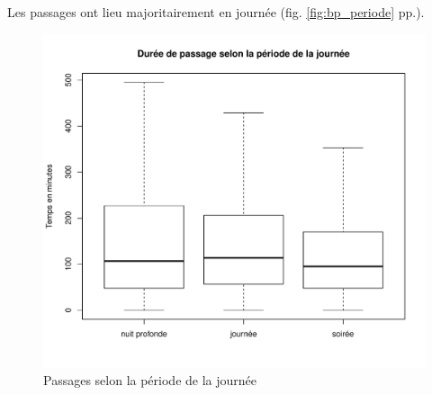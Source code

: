 \documentclass[12pt,english,french,twoside]{book}\usepackage[]{graphicx}\usepackage[]{color}
\makeatletter
\def\maxwidth{ %
  \ifdim\Gin@nat@width>\linewidth
    \linewidth
  \else
    \Gin@nat@width
  \fi
}
\newenvironment{knitrout}{}{} %
\makeatother
\begin{document}
Les passages ont lieu majoritairement en journée (fig. \ref{fig:bp_periode} pp.\pageref{fig:bp_periode}).


\begin{figure}[ht!]
 \centering
\begin{knitrout}
\color{fgcolor}
\includegraphics[width=\maxwidth]{figure/periode_2} 

\end{knitrout}

 \caption{Passages selon la période de la journée}
 \label{fig:bp_periode2}
\end{figure}
\end{document}
